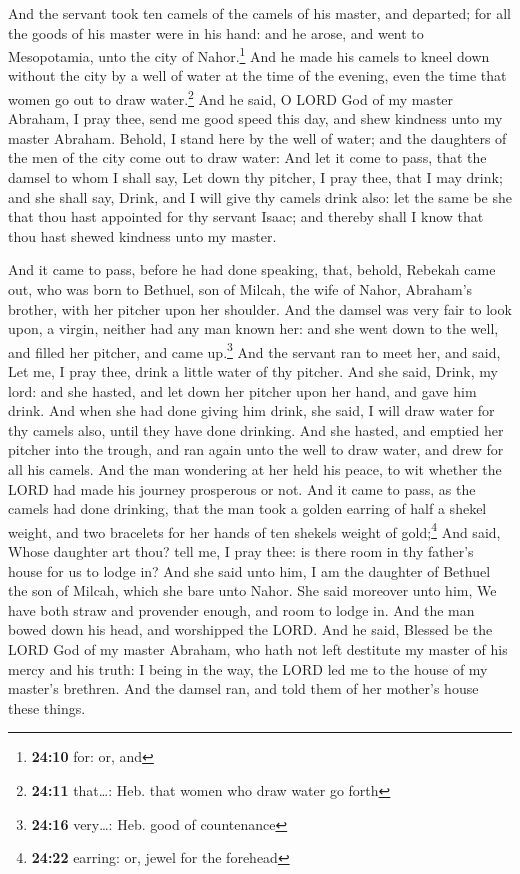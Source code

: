  And the servant took ten camels of the camels of his
master, and departed; for all the goods of his master were in his hand:
and he arose, and went to Mesopotamia, unto the city of
Nahor.\footnote{\textbf{24:10} for: or, and}  And he made
his camels to kneel down without the city by a well of water at the time
of the evening, even the time that women go out to draw
water.\footnote{\textbf{24:11} that\ldots: Heb. that women who draw
  water go forth}  And he said, O LORD God of my master
Abraham, I pray thee, send me good speed this day, and shew kindness
unto my master Abraham.  Behold, I stand here by the well
of water; and the daughters of the men of the city come out to draw
water:  And let it come to pass, that the damsel to whom
I shall say, Let down thy pitcher, I pray thee, that I may drink; and
she shall say, Drink, and I will give thy camels drink also: let the
same be she that thou hast appointed for thy servant Isaac; and thereby
shall I know that thou hast shewed kindness unto my master.

 And it came to pass, before he had done speaking, that,
behold, Rebekah came out, who was born to Bethuel, son of Milcah, the
wife of Nahor, Abraham's brother, with her pitcher upon her shoulder.
 And the damsel was very fair to look upon, a virgin,
neither had any man known her: and she went down to the well, and filled
her pitcher, and came up.\footnote{\textbf{24:16} very\ldots: Heb. good
  of countenance}  And the servant ran to meet her, and
said, Let me, I pray thee, drink a little water of thy pitcher.
 And she said, Drink, my lord: and she hasted, and let
down her pitcher upon her hand, and gave him drink.  And
when she had done giving him drink, she said, I will draw water for thy
camels also, until they have done drinking.  And she
hasted, and emptied her pitcher into the trough, and ran again unto the
well to draw water, and drew for all his camels.  And the
man wondering at her held his peace, to wit whether the LORD had made
his journey prosperous or not.  And it came to pass, as
the camels had done drinking, that the man took a golden earring of half
a shekel weight, and two bracelets for her hands of ten shekels weight
of gold;\footnote{\textbf{24:22} earring: or, jewel for the forehead}
 And said, Whose daughter art thou? tell me, I pray thee:
is there room in thy father's house for us to lodge in? 
And she said unto him, I am the daughter of Bethuel the son of Milcah,
which she bare unto Nahor.  She said moreover unto him,
We have both straw and provender enough, and room to lodge in.
 And the man bowed down his head, and worshipped the
LORD.  And he said, Blessed be the LORD God of my master
Abraham, who hath not left destitute my master of his mercy and his
truth: I being in the way, the LORD led me to the house of my master's
brethren.  And the damsel ran, and told them of her
mother's house these things.

